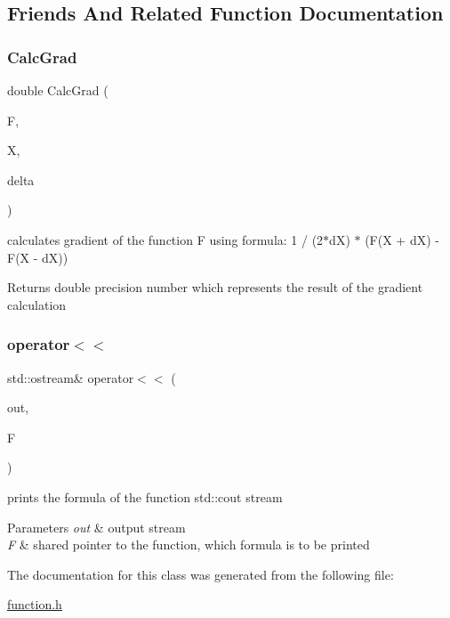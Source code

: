 \subsection{Friends And Related Function Documentation}
\mbox{\label{class_function_a74f93e0ab18699467c6a96e4c500b256}} 
\subsubsection{\texorpdfstring{Calc\+Grad}{CalcGrad}}
{\footnotesize\ttfamily double Calc\+Grad (\begin{DoxyParamCaption}\item[{std\+::shared\+\_\+ptr$<$ \hyperlink{class_function}{Function} $>$}]{F,  }\item[{const \hyperlink{classv_point}{v\+Point} \&}]{X,  }\item[{double}]{delta }\end{DoxyParamCaption})\hspace{0.3cm}{\ttfamily [friend]}}

calculates gradient of the function F using formula\+: 1 / (2$\ast$dX) $\ast$ (F(X + dX) -\/ F(X -\/ dX)) \begin{DoxyReturn}{Returns}
double precision number which represents the result of the gradient calculation 
\end{DoxyReturn}
\mbox{\label{class_function_ada3899626dabeaf7910d55f156499baf}} 
\subsubsection{\texorpdfstring{operator$<$$<$}{operator<<}}
{\footnotesize\ttfamily std\+::ostream\& operator$<$$<$ (\begin{DoxyParamCaption}\item[{std\+::ostream \&}]{out,  }\item[{std\+::shared\+\_\+ptr$<$ \hyperlink{class_function}{Function} $>$}]{F }\end{DoxyParamCaption})\hspace{0.3cm}{\ttfamily [friend]}}

prints the formula of the function std\+::cout stream 
\begin{DoxyParams}{Parameters}
{\em out} & output stream \\
\hline
{\em F} & shared pointer to the function, which formula is to be printed \\
\hline
\end{DoxyParams}


The documentation for this class was generated from the following file\+:\begin{DoxyCompactItemize}
\item 
\hyperlink{function_8h}{function.\+h}\end{DoxyCompactItemize}
